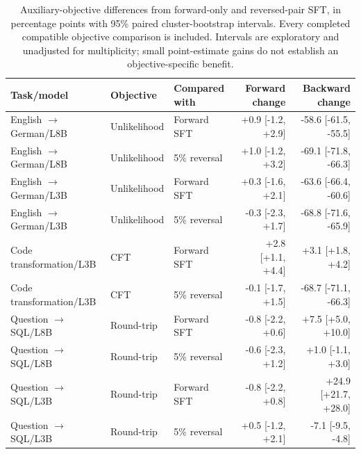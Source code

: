 \begin{table}[t]\centering\small
\begin{tabular}{lllrr}\toprule
Task/model & Objective & Compared with & Forward change & Backward change \\\midrule
English $\to$ German/L8B & Unlikelihood & Forward SFT & +0.9 [-1.2, +2.9] & -58.6 [-61.5, -55.5] \\
English $\to$ German/L8B & Unlikelihood & 5\% reversal & +1.0 [-1.2, +3.2] & -69.1 [-71.8, -66.3] \\
English $\to$ German/L3B & Unlikelihood & Forward SFT & +0.3 [-1.6, +2.1] & -63.6 [-66.4, -60.6] \\
English $\to$ German/L3B & Unlikelihood & 5\% reversal & -0.3 [-2.3, +1.7] & -68.8 [-71.6, -65.9] \\
Code transformation/L3B & CFT & Forward SFT & +2.8 [+1.1, +4.4] & +3.1 [+1.8, +4.2] \\
Code transformation/L3B & CFT & 5\% reversal & -0.1 [-1.7, +1.5] & -68.7 [-71.1, -66.3] \\
Question $\to$ SQL/L8B & Round-trip & Forward SFT & -0.8 [-2.2, +0.6] & +7.5 [+5.0, +10.0] \\
Question $\to$ SQL/L8B & Round-trip & 5\% reversal & -0.6 [-2.3, +1.2] & +1.0 [-1.1, +3.0] \\
Question $\to$ SQL/L3B & Round-trip & Forward SFT & -0.8 [-2.2, +0.8] & +24.9 [+21.7, +28.0] \\
Question $\to$ SQL/L3B & Round-trip & 5\% reversal & +0.5 [-1.2, +2.1] & -7.1 [-9.5, -4.8] \\
\bottomrule\end{tabular}
\caption{Auxiliary-objective differences from forward-only and reversed-pair SFT, in percentage points with 95\% paired cluster-bootstrap intervals. Every completed compatible objective comparison is included. Intervals are exploratory and unadjusted for multiplicity; small point-estimate gains do not establish an objective-specific benefit.}\label{tab:auxiliary-intervals}\end{table}
